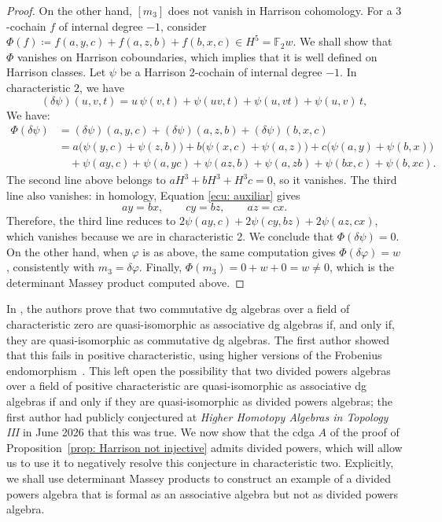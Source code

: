 \documentclass[11pt]{article}
\theoremstyle{definition}
\theoremstyle{definition}
\begin{document}
\begin{proof}
On the other hand, $[m_3]$ does not vanish in Harrison cohomology.
For a $3$-cochain $f$ of internal degree $-1$, consider $\Phi(f) \coloneqq f(a,y,c ) + f(a,z,b) + f(b,x,c) \in H^5=\mathbb F_2w.$
We shall show that $\Phi$ vanishes on Harrison coboundaries, which implies that it is well defined on Harrison classes.
Let $\psi$ be a Harrison $2$-cochain of internal degree $-1$. 
In characteristic $2$, we have
\begin{equation*}
(\delta \psi)(u,v,t)= u \, \psi(v,t) + \psi(uv,t) + \psi(u,vt) + \psi(u,v) \, t,
\end{equation*}
We have:
\begin{align*}
\Phi(\delta\psi)
&=(\delta\psi)(a,y,c)+(\delta\psi)(a,z,b)+(\delta\psi)(b,x,c)\\
&=a\bigl(\psi(y,c)+\psi(z,b)\bigr)+b\bigl(\psi(x,c)+\psi(a,z)\bigr)+c\bigl(\psi(a,y)+\psi(b,x)\bigr)\\
&\quad+\psi(ay,c)+\psi(a,yc)+\psi(az,b)+\psi(a,zb)+\psi(bx,c)+\psi(b,xc).
\end{align*}
The second line above belongs to $aH^3 + bH^3 + H^3c = 0$, so it vanishes.
The third line also vanishes: in homology, Equation \eqref{ecu: auxiliar} gives  
\begin{equation*}
ay = bx, \qquad cy = bz, \qquad az=cx.
\end{equation*}
Therefore, the third line reduces to $2\psi(ay,c) + 2\psi(cy,bz) + 2\psi(az,cx)$, 
which vanishes because we are in characteristic 2.
We conclude that $\Phi(\delta\psi)=0$.
On the other hand, when $\varphi$ is as above, the same computation gives $\Phi(\delta\varphi)=w$,
consistently with $m_3= \delta \varphi$.
Finally, $\Phi(m_3)=0+w+0=w\neq 0$, which is the determinant Massey product computed above.
\end{proof}

In \cite{campos24}, the authors prove that two commutative dg algebras over a field of characteristic zero are quasi-isomorphic as associative dg algebras if, and only if, they are
quasi-isomorphic as commutative dg algebras. 
The first author showed that this fails in positive characteristic, using higher versions of the Frobenius endomorphism~\cite{Oisin--ObstructionTheory}. 
This left open the possibility that two divided powers algebras over a field of positive characteristic are quasi-isomorphic as associative dg algebras if and only if they are quasi-isomorphic as divided powers algebras; the first author had publicly  conjectured at \emph{Higher Homotopy Algebras in Topology III} in June 2026 that this was true. 
We now show that the cdga $A$ of the proof of Proposition~\ref{prop: Harrison not injective} admits divided powers, which will allow us to use it to negatively resolve this conjecture in characteristic two.
Explicitly, we shall use determinant Massey products to construct an example of a divided powers algebra
that is formal as an associative algebra but not as divided powers algebra.  
\end{document}
